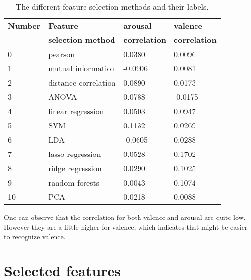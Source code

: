 \begin{table}[H]
\centering
\begin{tabular}{llll}
\textbf{Number} & \textbf{Feature}        & \textbf{arousal} & \textbf{valence} \\
                & \textbf{selection method} & \textbf{correlation} & \textbf{correlation}\\ \hline
0               & pearson              & 0.0380    & 0.0096          \\
1               & mutual information   & -0.0906   & 0.0081          \\
2               & distance correlation & 0.0890    & 0.0173          \\
3               & ANOVA                & 0.0788    & -0.0175         \\
4               & linear regression    & 0.0503    & 0.0947          \\
5               & SVM                  & 0.1132    & 0.0269          \\
6               & LDA                  & -0.0605   & 0.0288          \\
7               & lasso regression     & 0.0528    & 0.1702          \\
8               & ridge regression     & 0.0290    & 0.1025          \\
9               & random forests       & 0.0043    & 0.1074          \\
10              & PCA                  & 0.0218    & 0.0088         
\end{tabular}
\caption{The different feature selection methods and their labels\label{corrsCompLbl}.}
\end{table}



One can observe that the correlation for both valence and arousal are quite low. However they are a little higher for valence, which indicates that might be easier to recognize valence.

\section{Selected features}

